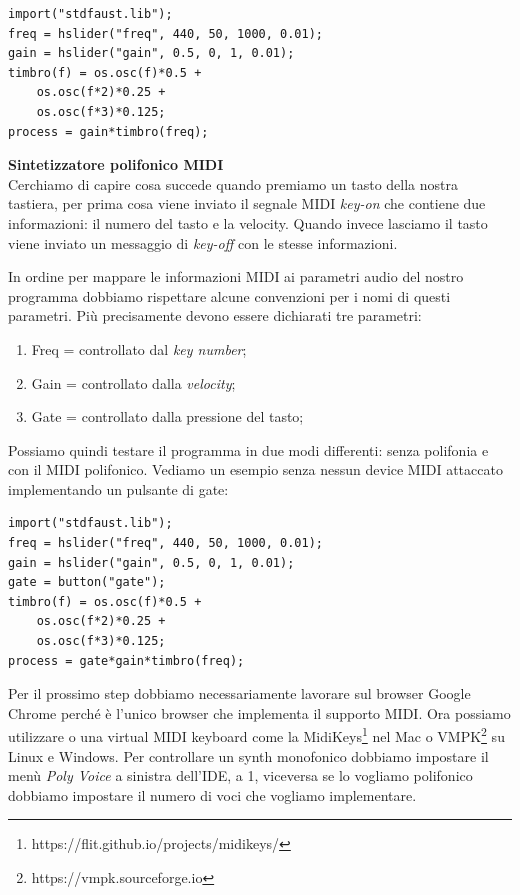 \documentclass[11pt]{article}
\begin{document}
\begin{multicols*}{2}
\begin{Verbatim}[fontsize=\footnotesize]
import("stdfaust.lib");
freq = hslider("freq", 440, 50, 1000, 0.01);
gain = hslider("gain", 0.5, 0, 1, 0.01);
timbro(f) = os.osc(f)*0.5 + 
    os.osc(f*2)*0.25 + 
    os.osc(f*3)*0.125;
process = gain*timbro(freq);
\end{Verbatim}

\textbf{Sintetizzatore polifonico MIDI}\\

Cerchiamo di capire cosa succede quando premiamo un tasto della nostra tastiera, per prima cosa viene inviato il segnale MIDI \textit{key-on} che contiene due informazioni: il numero del tasto e la velocity. Quando invece lasciamo il tasto viene inviato un messaggio di \textit{key-off} con le stesse informazioni.

In ordine per mappare le informazioni MIDI ai parametri audio del nostro programma dobbiamo rispettare alcune convenzioni per i nomi di questi parametri. Più precisamente devono essere dichiarati tre parametri:

\begin{enumerate}
\item Freq = controllato dal \textit{key number}; 
\item Gain = controllato dalla \textit{velocity}; 
\item Gate = controllato dalla pressione del tasto;
\end{enumerate}

Possiamo quindi testare il programma in due modi differenti: senza polifonia e con il MIDI polifonico. Vediamo un esempio senza nessun device MIDI attaccato implementando un pulsante di gate:

\begin{Verbatim}[fontsize=\footnotesize]
import("stdfaust.lib");
freq = hslider("freq", 440, 50, 1000, 0.01);
gain = hslider("gain", 0.5, 0, 1, 0.01);
gate = button("gate");
timbro(f) = os.osc(f)*0.5 + 
    os.osc(f*2)*0.25 + 
    os.osc(f*3)*0.125;
process = gate*gain*timbro(freq);
\end{Verbatim}

Per il prossimo step dobbiamo necessariamente lavorare sul browser Google Chrome perché è l'unico browser che implementa il supporto MIDI. Ora possiamo utilizzare o una virtual MIDI keyboard come la MidiKeys\footnote{https://flit.github.io/projects/midikeys/} nel Mac o VMPK\footnote{https://vmpk.sourceforge.io} su Linux e Windows. Per controllare un synth monofonico dobbiamo impostare il menù \textit{Poly Voice} a sinistra dell'IDE, a 1, viceversa se lo vogliamo polifonico dobbiamo impostare il numero di voci che vogliamo implementare.


\end{multicols*}
\end{document}
